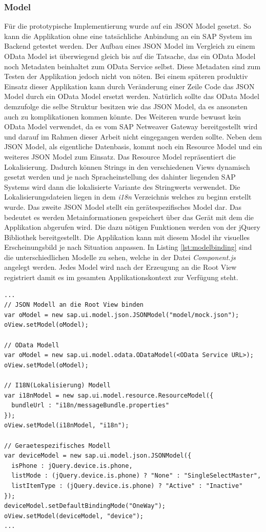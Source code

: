\subsubsection{Model}
Für die prototypische Implementierung wurde auf ein JSON Model gesetzt. So kann die Applikation ohne eine tatsächliche Anbindung an ein SAP System im Backend getestet werden. Der Aufbau eines JSON Model im Vergleich zu einem OData Model ist überwiegend gleich bis auf die Tatsache, das ein OData Model noch Metadaten beinhaltet zum OData Service selbst. Diese Metadaten sind zum Testen der Applikation jedoch nicht von nöten. Bei einem späteren produktiv Einsatz dieser Applikation kann durch Veränderung einer Zeile Code das JSON Model durch ein OData Model ersetzt werden. Natürlich sollte das OData Model demzufolge die selbe Struktur besitzen wie das JSON Model, da es ansonsten auch zu komplikationen kommen könnte. Des Weiteren wurde bewusst kein OData Model verwendet, da es vom SAP Netweaver Gateway bereitgestellt wird und darauf im Rahmen dieser Arbeit nicht eingegangen werden sollte. Neben dem JSON Model, als eigentliche Datenbasis, kommt noch ein Resource Model und ein weiteres JSON Model zum Einsatz. Das Resource Model repräsentiert die Lokalisierung. Dadurch können Strings in den verschiedenen Views dynamisch gesetzt werden und je nach Spracheinstellung des dahinter liegenden SAP Systems wird dann die lokalisierte Variante des Stringwerts verwendet. Die Lokalisierungsdateien liegen in dem \textit{i18n} Verzeichnis welches zu beginn erstellt wurde. Das zweite JSON Model stellt ein gerätespezifisches Model dar. Das bedeutet es werden Metainformationen gespeichert über das Gerät mit dem die Applikation abgerufen wird. Die dazu nötigen Funktionen werden von der jQuery Bibliothek bereitgestellt. Die Applikation kann mit diesem Model ihr visuelles Erscheinungsbild je nach Situation anpassen. In Listing \ref{lst:modelbinding} sind die unterschiedlichen Modelle zu sehen, welche in der Datei \textit{Component.js} angelegt werden. Jedes Model wird nach der Erzeugung an die Root View registriert damit es im gesamten Applikationskontext zur Verfügung steht.

\vspace{1em}
\begin{lstlisting}[frame=htrbl, caption=Model an die Root View binden, label=lst:modelbinding]
...
// JSON Modell an die Root View binden
var oModel = new sap.ui.model.json.JSONModel("model/mock.json");
oView.setModel(oModel);

// OData Modell
var oModel = new sap.ui.model.odata.ODataModel(<OData Service URL>);
oView.setModel(oModel);

// I18N(Lokalisierung) Modell
var i18nModel = new sap.ui.model.resource.ResourceModel({
  bundleUrl : "i18n/messageBundle.properties"
});
oView.setModel(i18nModel, "i18n");

// Geraetespezifisches Modell
var deviceModel = new sap.ui.model.json.JSONModel({
  isPhone : jQuery.device.is.phone,
  listMode : (jQuery.device.is.phone) ? "None" : "SingleSelectMaster",
  listItemType : (jQuery.device.is.phone) ? "Active" : "Inactive"
});
deviceModel.setDefaultBindingMode("OneWay");
oView.setModel(deviceModel, "device");
...
\end{lstlisting}

